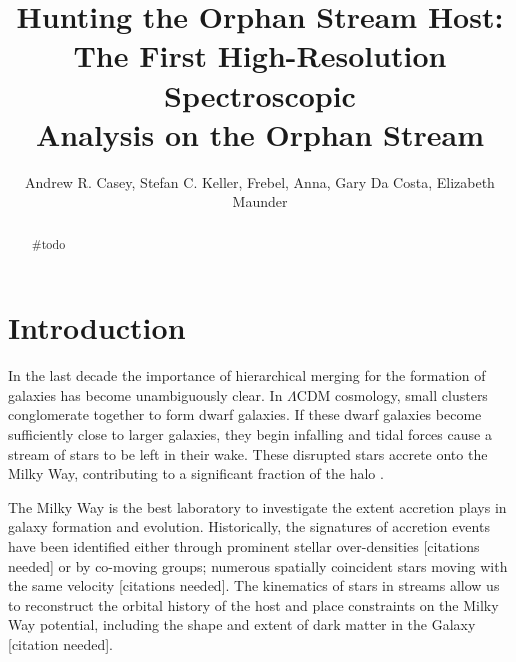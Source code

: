\documentclass{emulateapj}
\begin{document}
\title{Hunting the Orphan Stream Host: The First High-Resolution Spectroscopic\\ Analysis on the Orphan Stream}

\author{Andrew R. Casey, Stefan C. Keller, Frebel, Anna, Gary Da Costa, Elizabeth Maunder}


\begin{abstract}
\#todo
\end{abstract}


\section{Introduction}

In the last decade the importance of hierarchical merging for the formation of galaxies has become unambiguously clear. In $\Lambda$CDM cosmology, small clusters conglomerate together to form dwarf galaxies. If these dwarf galaxies become sufficiently close to larger galaxies, they begin infalling and tidal forces cause a stream of stars to be left in their wake. These disrupted stars accrete onto the Milky Way, contributing to a significant fraction of the halo \citet{Bell;et-al_2008}.

 

  The Milky Way is the best laboratory to investigate the extent accretion plays in galaxy formation and evolution. Historically, the signatures of accretion events have been identified either through prominent stellar over-densities [citations needed] or by co-moving groups; numerous spatially coincident stars moving with the same velocity [citations needed]. The kinematics of stars in streams allow us to reconstruct the orbital history of the host and place constraints on the Milky Way potential, including the shape and extent of dark matter in the Galaxy [citation needed]. 
 
\end{document}
